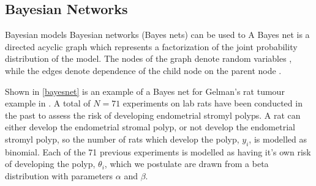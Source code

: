 \subsection{Bayesian Networks}



Bayesian models  Bayesian networks (Bayes nets) can be used to   A Bayes net is a directed acyclic graph which represents a factorization of the joint probability distribution of the model. The nodes of the graph denote random variables , while the edges denote dependence of the child node on the parent node \cite{Bishop2006pattern}. 

Shown in \cref{bayesnet} is an example of a Bayes net for Gelman's rat tumour example in \cite{gelman2013bayesian}.  A total of $ N = 71 $ experiments on lab rats have been conducted in the past to assess the risk of developing endometrial stromyl polyps.  A rat can either develop the endometrial stromal polyp, or not develop the endometrial stromyl polyp, so the number of rats which develop the polyp, $ y_i $, is modelled as binomial.  Each of the 71 previous experiments is modelled as having it's own risk of developing the polyp, $ \theta_i $, which we postulate are drawn from a beta distribution with parameters $ \alpha $ and $ \beta $.  

